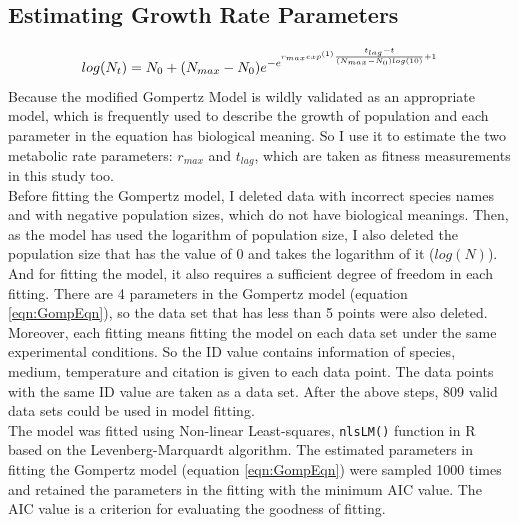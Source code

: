 \documentclass[a4paper]{article}
\begin{document}
\subsection{Estimating Growth Rate Parameters}
\begin{equation} 
\label{eqn:GompEqn}
    log(N_t)= N_0 + (N_{max} - N_0) e^{-e^{r_{max} exp^{(1)}  {\frac{t_{lag}-t}{(N_{max}-N_0)log(10)}\\} +1}}
\end{equation}
Because the modified Gompertz Model \citep{zwietering1990modeling} is wildly validated as an appropriate model, which is frequently used to describe the growth of population and each parameter in the equation has biological meaning. So I use it to estimate the two metabolic rate parameters: $r_{max}$ and $t_{lag}$, which are taken as fitness measurements in this study too. \\

Before fitting the Gompertz model, I deleted data with incorrect species names and with negative population sizes, which do not have biological meanings. Then, as the model has used the logarithm of population size, I also deleted the population size that has the value of 0 and takes the logarithm of it ($log(N)$). And for fitting the model, it also requires a sufficient degree of freedom in each fitting. There are 4 parameters in the Gompertz model (equation \ref{eqn:GompEqn}), so the data set that has less than 5 points were also deleted. Moreover, each fitting means fitting the model on each data set under the same experimental conditions. So the ID value contains information of species, medium, temperature and citation is given to each data point. The data points with the same ID value are taken as a data set. After the above steps, 809 valid data sets could be used in model fitting.\\

The model was fitted using Non-linear Least-squares, \texttt{nlsLM()} function in R based on the Levenberg-Marquardt algorithm. The estimated parameters in fitting the Gompertz model (equation \ref{eqn:GompEqn}) were sampled 1000 times and retained the parameters in the fitting with the minimum AIC value. The AIC value is a criterion for evaluating the goodness of fitting. \\
\end{document}
